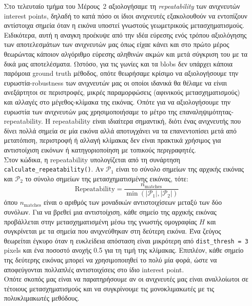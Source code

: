 \documentclass[12pt, a4paper]{article}
\begin{document}
Στο τελευταίο τμήμα του Μέρους~2 αξιολογήσαμε τη \emph{repeatability} των
ανιχνευτών interest points, δηλαδή το κατά πόσο οι ίδιοι ανιχνευτές
εξακολουθούν να εντοπίζουν αντίστοιχα σημεία όταν η εικόνα υποστεί γνωστούς
γεωμετρικούς μετασχηματισμούς. Ειδικότερα, αυτή η αναγκη προέκυψε από την ιδέα εύρεσης ενός τρόπου αξιολόγησης των αποτελεσμάτων των ανιχνευτών μας όπως είχαε κάνει και στο πρώτο μέρος θεωρώντας κάποιον αλγόριθμο εύρεσης αληθινών ακμών και μετά σύγκριση  του με τα δικά μας αποτελέσματα. 
Ωστόσο, για τις γωνίες και τα blobs  δεν υπάρχει κάποια παρόμοια ground truth μέθοδος, οπότε θεωρήσαμε κρίσιμο να αξιολογήσουμε την ευρωστία-robustness
των ανιχνευτών μας οι οποίοι ιδανικά θα θέλαμε να είναι ανεξάρτητοι σε περιστροφές, μικρές παραμορφώσεις (αφινικούς μετασχηματισμούς) και αλλαγές στο μέγεθος-κλίμακα της εικόνας\cite{maragos2005features}. Οπότε για να αξιολογήσουμε την ευρωστία των ανιχνευτών μας χρησιμοποιήσαμε το μέτρο της επαναληψιμότητας-repeatability. Η repeatability είναι ιδιαίτερα σημαντική,
διότι ένας ανιχνευτής που δίνει πολλά σημεία σε μία εικόνα αλλά
αποτυγχάνει να τα επανεντοπίσει μετά από μετατόπιση, περιστροφή ή αλλαγή
κλίμακας δεν είναι πρακτικά χρήσιμος για αντιστοίχιση εικόνων  ή
κατηγοριοποίηση με τοπικούς περιγραφητές.\\
Στον κώδικα, η repeatability υπολογίζεται από τη συνάρτηση
\texttt{calculate\_repeatability()}. Αν
$\mathcal{P}_1$ είναι το σύνολο σημείων της αρχικής εικόνας και
$\mathcal{P}_2$ το σύνολο σημείων της μετασχηματισμένης εικόνας, τότε:
\begin{equation}
    \mathrm{Repeatability}
    =
    \frac{n_{\mathrm{matches}}}
         {\min\left(|\mathcal{P}_1|, |\mathcal{P}_2|\right)}
\end{equation}
όπου $n_{\mathrm{matches}}$ είναι ο αριθμός των μοναδικών αντιστοιχίσεων
μεταξύ των δύο συνόλων. Για να βρεθεί μια αντιστοίχιση, κάθε σημείο της
αρχικής εικόνας προβάλλεται στην μετασχηματισμένη μέσω της γνωστής ομογραφίας
$H$ και συγκρίνεται με τα σημεία που ανιχνεύθηκαν στη δεύτερη εικόνα. Ένα
ζεύγος θεωρείται έγκυρο όταν η ευκλείδεια απόσταση είναι μικρότερη από
\texttt{dist\_thresh = 3} pixels και ένα ποσοστό ανοχής 0.5 για τη τιμή της κλίμακας. Επιπλέον, κάθε σημείο της δεύτερης εικόνας
μπορεί να χρησιμοποιηθεί το πολύ μία φορά, ώστε να αποφεύγονται πολλαπλές
αντιστοιχίσεις στο ίδιο interest point.\\
Οπότε σκοπός μας είναι να παρατηρήσουμε αν οι ανιχνευτές μας είναι αναλλοίωτοι σε τέτοιους μετασχηματισμούς και να συγκρίνουμε τις μονοκλιμακωτές με τις πολυκλιμακωτές μεθόδους.
\end{document}
